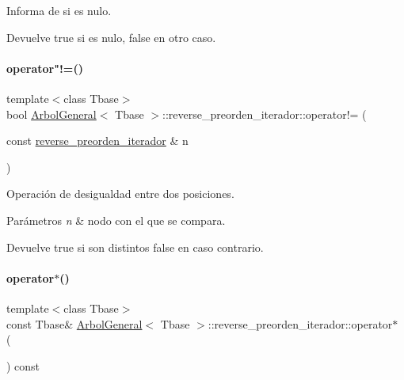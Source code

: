 Informa de si es nulo. 

\begin{DoxyReturn}{Devuelve}
true si es nulo, false en otro caso. 
\end{DoxyReturn}
\hypertarget{classArbolGeneral_1_1reverse__preorden__iterador_a908b03ace52ea925b7592b7b45814822}{}\label{classArbolGeneral_1_1reverse__preorden__iterador_a908b03ace52ea925b7592b7b45814822} 
\paragraph{\texorpdfstring{operator"!=()}{operator!=()}}
{\footnotesize\ttfamily template$<$class Tbase$>$ \\
bool \hyperlink{classArbolGeneral}{Arbol\+General}$<$ Tbase $>$\+::reverse\+\_\+preorden\+\_\+iterador\+::operator!= (\begin{DoxyParamCaption}\item[{const \hyperlink{classArbolGeneral_1_1reverse__preorden__iterador}{reverse\+\_\+preorden\+\_\+iterador} \&}]{n }\end{DoxyParamCaption})\hspace{0.3cm}{\ttfamily [inline]}}



Operación de desigualdad entre dos posiciones. 


\begin{DoxyParams}{Parámetros}
{\em n} & nodo con el que se compara. \\
\hline
\end{DoxyParams}
\begin{DoxyReturn}{Devuelve}
true si son distintos false en caso contrario. 
\end{DoxyReturn}
\hypertarget{classArbolGeneral_1_1reverse__preorden__iterador_a13eff9271fc2322fb191ba0323680a6d}{}\label{classArbolGeneral_1_1reverse__preorden__iterador_a13eff9271fc2322fb191ba0323680a6d} 
\paragraph{\texorpdfstring{operator$\ast$()}{operator*()}\hspace{0.1cm}{\footnotesize\ttfamily [1/2]}}
{\footnotesize\ttfamily template$<$class Tbase$>$ \\
const Tbase\& \hyperlink{classArbolGeneral}{Arbol\+General}$<$ Tbase $>$\+::reverse\+\_\+preorden\+\_\+iterador\+::operator$\ast$ (\begin{DoxyParamCaption}{ }\end{DoxyParamCaption}) const\hspace{0.3cm}{\ttfamily [inline]}}



